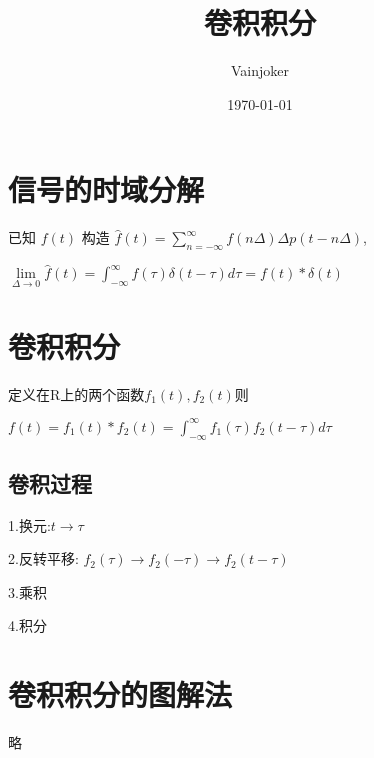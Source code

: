 \documentclass{article}
\title{卷积积分}
\author{Vainjoker}
\date{\today}
\begin{document}
    \maketitle
    \newpage

    \section{信号的时域分解}%
    已知 $f(t)$ 构造
    $\hat{f}(t)=\sum\limits_{n=-\infty}^{\infty}f(n\Delta)\Delta p(t-n\Delta)$,
    
    $\lim\limits_{\Delta \to 0 }\hat{f}(t)=\int_{-\infty}^{\infty}f(\tau)\delta (t-\tau)d\tau=f(t)*\delta(t)$

    \section{卷积积分}%
    定义在R上的两个函数$f_1(t),f_2(t)$则

    $f(t)=f_1(t)*f_2(t)=\int_{-\infty}^{\infty}f_1(\tau)f_2(t-\tau)d\tau$
    \subsection{卷积过程}%
    1.换元:$t\to\tau$

    2.反转平移: $f_2(\tau) \to f_2(-\tau) \to f_2(t-\tau)$

    3.乘积

    4.积分

    \section{卷积积分的图解法}%

    略
    
\end{document}
